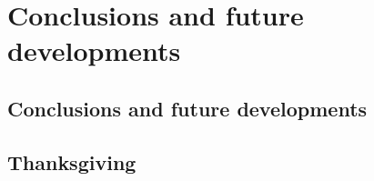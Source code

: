 \chapter{Conclusions and future developments}

\section{Conclusions and future developments}


\section{Thanksgiving}